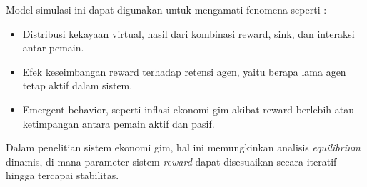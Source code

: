 Model simulasi ini dapat digunakan untuk mengamati fenomena seperti \citep{NichollsAmelungStudent2017} :

\begin{itemize}
    \item Distribusi kekayaan virtual, hasil dari kombinasi reward, sink, dan interaksi antar pemain.
    \item Efek keseimbangan reward terhadap retensi agen, yaitu berapa lama agen tetap aktif dalam sistem.
    \item Emergent behavior, seperti inflasi ekonomi gim akibat reward berlebih atau ketimpangan antara pemain aktif dan pasif.
\end{itemize}

Dalam penelitian sistem ekonomi gim, hal ini memungkinkan analisis \textit{equilibrium} dinamis, di mana parameter sistem \textit{reward} dapat disesuaikan secara iteratif hingga tercapai stabilitas.
